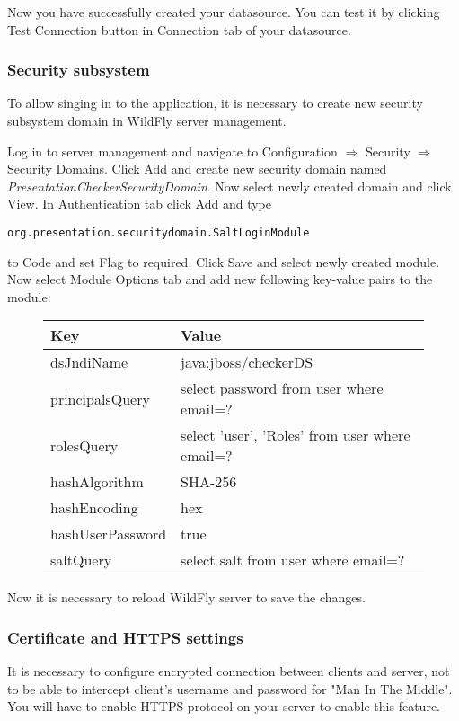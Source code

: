 \documentclass[12pt,a4paper]{article}
\begin{document}
Now you have successfully created your datasource. You can test it by clicking Test Connection button in Connection tab of your datasource.

\subsubsection{Security subsystem}
To allow singing in to the application, it is necessary to create new security subsystem domain in WildFly server management.

Log in to server management and navigate to Configuration $\Rightarrow$ Security $\Rightarrow$ Security Domains. Click Add and create new security domain named \textit{PresentationCheckerSecurityDomain}. Now select newly created domain and click View. In Authentication tab click Add and type
\begin{lstlisting}
org.presentation.securitydomain.SaltLoginModule
\end{lstlisting}
to Code and set Flag to required. Click Save and select newly created module. Now select Module Options tab and add new following key-value pairs to the module:
\begin{figure}[htbp]
\centering
\begin{tabular}{| l | l |}
\hline
Key & Value \\
\hline
dsJndiName & java:jboss/checkerDS \\
principalsQuery & select password from user where email=? \\
rolesQuery & select 'user', 'Roles' from user where email=? \\
hashAlgorithm & SHA-256 \\
hashEncoding & hex \\
hashUserPassword & true \\
saltQuery & select salt from user where email=? \\
\hline
\end{tabular}
\end{figure}

Now it is necessary to reload WildFly server to save the changes.

\subsubsection{Certificate and HTTPS settings}
It is necessary to configure encrypted connection between clients and server, not to be able to intercept client's username and password for "Man In The Middle". You will have to enable HTTPS protocol on your server to enable this feature. 
\end{document}
